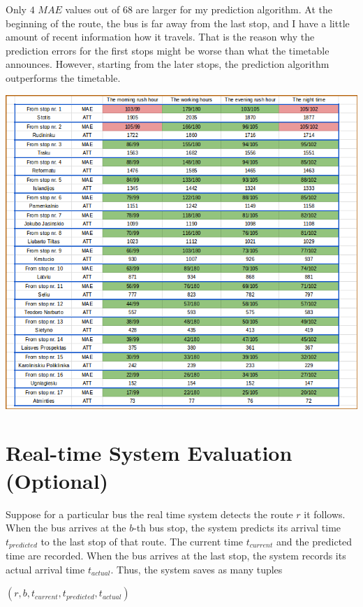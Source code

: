 \documentclass[12pt,a4paper,oneside,openright]{report}
\begin{document}
Only $4$ $MAE$ values out of $68$ are larger for my prediction algorithm. At the
beginning of the route, the bus is far away from the last stop, and I have a little amount
of recent information how it travels. That is the reason why the prediction errors
for the first stops might be worse than what the timetable announces. However,
starting from the later stops, the prediction algorithm outperforms the timetable.

\includegraphics[width=\textwidth]{figs/table_of_vilnius.png} \\




\newpage
\section{Real-time System Evaluation (Optional)}

Suppose for a particular bus the real time system detects the route $r$ it follows.
When the bus arrives at the $b$-th bus stop, the system predicts its arrival time 
$t_{predicted}$ to the last stop of that route. The current time $t_{current}$
and the predicted time are recorded. When the bus arrives at the last stop,
the system records its actual arrival time $t_{actual}$. Thus, the system saves
as many tuples

\begin{center}
$(r, b, t_{current}, t_{predicted}, t_{actual})$
\end{center}
\end{document}

